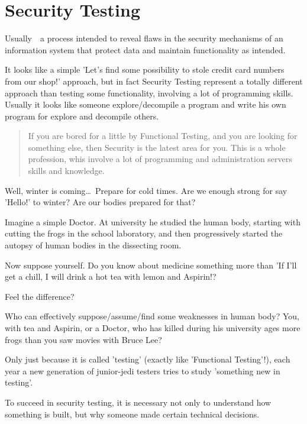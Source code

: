 \section{Security Testing}
\label{sec:Security Testing}

Usually~\textemdash~a process intended to reveal flaws in the security mechanisms of an information system that protect data and maintain functionality as intended.

It looks like a simple 'Let's find some possibility to stole credit card numbers from our shop!' approach, but in fact Security Testing represent a totally different approach than testing some functionality, involving a lot of programming skills. Usually it looks like someone explore/decompile a program and write his own program for explore and decompile others.

\begin{quote}
 If you are bored for a little by Functional Testing, and you are looking for something else, then Security is the latest area for you. This is a whole profession, whis involve a lot of programming and administration servers skills and knowledge.
\end{quote} 

Well, winter is coming\ldots~Prepare for cold times. Are we enough strong for say 'Hello!' to winter? Are our bodies prepared for that?

Imagine a simple Doctor. At university he studied the human body, starting with cutting the frogs in the school laboratory, and then progressively started the autopsy of human bodies in the dissecting room.

Now suppose yourself. Do you know about medicine something more than 'If I'll get a chill, I will drink a hot tea with lemon and Aspirin!?

Feel the difference?

Who can effectively suppose/assume/find some weaknesses in human body? You, with tea and Aspirin, or a Doctor, who has killed during his university ages more frogs than you saw movies with Bruce Lee?

Only just because it is called 'testing' (exactly like 'Functional Testing'!), each year a new generation of junior-jedi testers tries to study 'something new in testing'.

To succeed in security testing, it is necessary not only to understand how something is built, but why someone made certain technical decisions.
